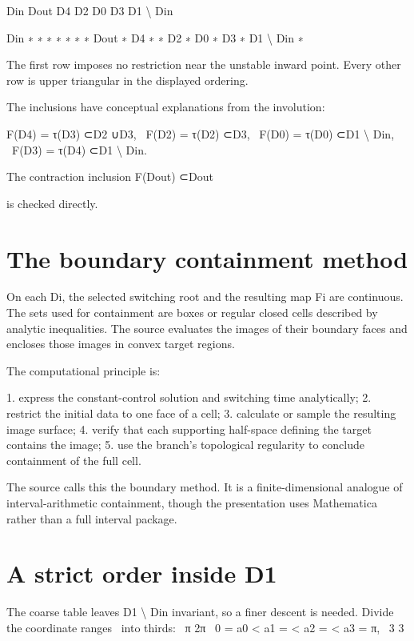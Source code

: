 Din Dout D4 D2 D0 D3 D1 \textbackslash{} Din


Din ∗ ∗ ∗ ∗ ∗ ∗ ∗ Dout ∗ D4 ∗ ∗ D2 ∗ D0 ∗ D3 ∗ D1 \textbackslash{} Din ∗


The first row imposes no restriction near the unstable inward point. Every other row is upper triangular in the displayed ordering.


The inclusions have conceptual explanations from the involution:


\begin{displaytext}
F(D4) = τ(D3) ⊂D2 ∪D3, \
F(D2) = τ(D2) ⊂D3, \
F(D0) = τ(D0) ⊂D1 \textbackslash{} Din, \
F(D3) = τ(D4) ⊂D1 \textbackslash{} Din.
\end{displaytext}

The contraction inclusion F(Dout) ⊂Dout


is checked directly.


\section{The boundary containment method}

On each Di, the selected switching root and the resulting map Fi are continuous. The sets used for containment are boxes or regular closed cells described by analytic inequalities. The source evaluates the images of their boundary faces and encloses those images in convex target regions.


The computational principle is:


1. express the constant-control solution and switching time analytically; 2. restrict the initial data to one face of a cell; 3. calculate or sample the resulting image surface; 4. verify that each supporting half-space defining the target contains the image; 5. use the branch’s topological regularity to conclude containment of the full cell.


The source calls this the boundary method. It is a finite-dimensional analogue of interval-arithmetic containment, though the presentation uses Mathematica rather than a full interval package.


\section{A strict order inside D1}

\begin{displaytext}
The coarse table leaves D1 \textbackslash{} Din invariant, so a finer descent is needed. Divide the coordinate ranges \
into thirds: \
π 2π \
0 = a0 < a1 = < a2 = < a3 = π, \
3 3
\end{displaytext}

